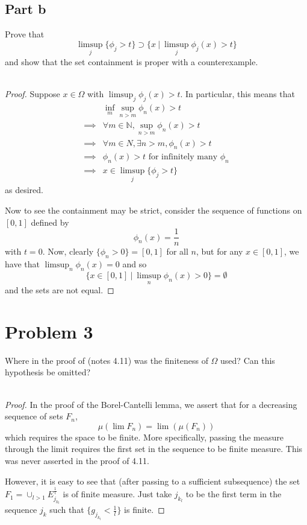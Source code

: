 \documentclass[fontsize=11pt]{scrartcl} %
\numberwithin{equation}{section} %
\numberwithin{figure}{section} %
\numberwithin{table}{section} %
\newcommand{\N}{\mathbb{N}}
\begin{document}
\subsection*{Part b}
Prove that
\[
    \limsup_j \{\phi_j > t\} \supset \{x\ |\ \limsup_j \phi_j(x) > t\}
\]
and show that the set containment is proper with a counterexample.
\\
\\
\begin{proof}
    Suppose $x\in\Omega$ with $\limsup_j\phi_j(x)>t$. In particular, this means
    that
    \[
        \begin{aligned}
            &\inf_m\sup_{n>m}\phi_n(x) > t\\
            \implies &\forall m\in \N, \sup_{n>m} \phi_n(x) > t\\
            \implies &\forall m\in N, \exists n>m, \phi_n(x) > t\\
            \implies &\phi_n(x) > t \textrm{ for infinitely many }\phi_n\\
            \implies &x\in\limsup_j\{\phi_j > t\}
        \end{aligned}
    \]
    as desired.

    Now to see the containment may be strict, consider the sequence of functions
    on $[0,1]$ defined by
    \[
        \phi_n(x) = \frac{1}{n}
    \]
    with $t=0$. Now, clearly $\{\phi_n > 0\} = [0,1]$ for all $n$, but for any
    $x\in[0,1]$, we have that $\limsup_n\phi_n(x) = 0$ and so
    \[
        \{x\in [0,1]\ |\ \limsup_n\phi_n(x)>0\} = \emptyset
    \]
    and the sets are not equal.
\end{proof}

\section*{Problem 3}
Where in the proof of (notes 4.11) was the finiteness of $\Omega$ used? Can this
hypothesis be omitted?
\\
\\
\begin{proof}
In the proof of the Borel-Cantelli lemma, we assert that for a decreasing
    sequence of sets $F_n$,
    \[
        \mu(\lim F_n) = \lim(\mu(F_n))
    \]
    which requires the space to be finite. More specifically, passing the
    measure through the limit requires the first set in the sequence to be
    finite measure. This was never asserted in the proof of 4.11.

    However, it is easy to see that (after passing to a sufficient subsequence)
    the set $F_1 = \cup_{l>1}E_{j_{k_l}}^{\frac{1}{l}}$ is of finite measure. Just
    take $j_{k_l}$ to be the first term in the sequence $j_k$ such that
    $\{g_{j_{k_l}} < \frac{1}{l}\}$ is finite.
\end{proof}
\end{document}

